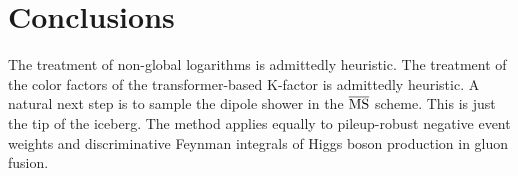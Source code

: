 \section{Conclusions}\label{sec:conclusions}

The treatment of non-global logarithms is admittedly heuristic. The
treatment of the color factors of the transformer-based K-factor is
admittedly heuristic. A natural next step is to sample the dipole shower
in the $\overline{\rm MS}$ scheme. This is just the tip of the iceberg.
The method applies equally to pileup-robust negative event weights and
discriminative Feynman integrals of Higgs boson production in gluon
fusion.

